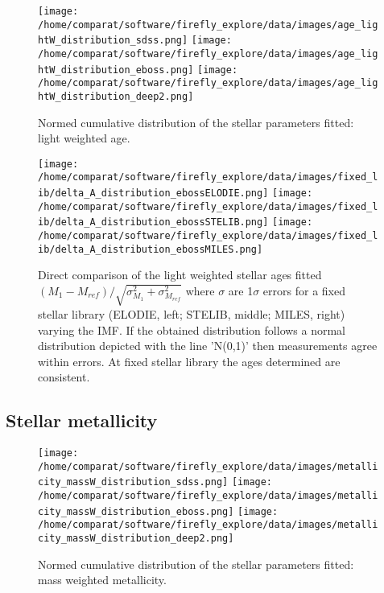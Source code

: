 \documentclass[onecolumn]{aa}
\begin{document}
\begin{figure}
\begin{center}
\caption{\label{fig:distributions:LwA} 
Normed cumulative distribution of the stellar parameters fitted: light weighted age.}  
\texttt{[image: /home/comparat/software/firefly\_explore/data/images/age\_lightW\_distribution\_sdss.png]}
\texttt{[image: /home/comparat/software/firefly\_explore/data/images/age\_lightW\_distribution\_eboss.png]}
\texttt{[image: /home/comparat/software/firefly\_explore/data/images/age\_lightW\_distribution\_deep2.png]}
\end{center}
\end{figure}

\begin{figure}
\begin{center}
\caption{\label{fig:comparison:imfs:A} 
Direct comparison of the light weighted stellar ages fitted $(M_1-M_{ref})/\sqrt{\sigma^2_{M_1}+\sigma^2_{M_{ref}}}$ where $\sigma$ are 1$\sigma$ errors for a fixed stellar library (ELODIE, left; STELIB, middle; MILES, right) varying the IMF. 
If the obtained distribution follows a normal distribution depicted with the line 'N(0,1)' then measurements agree within errors. 
At fixed stellar library the ages determined are consistent.}
\texttt{[image: /home/comparat/software/firefly\_explore/data/images/fixed\_lib/delta\_A\_distribution\_ebossELODIE.png]}
\texttt{[image: /home/comparat/software/firefly\_explore/data/images/fixed\_lib/delta\_A\_distribution\_ebossSTELIB.png]}
\texttt{[image: /home/comparat/software/firefly\_explore/data/images/fixed\_lib/delta\_A\_distribution\_ebossMILES.png]}
\end{center}
\end{figure}

\subsection{Stellar metallicity}

\begin{figure}
\begin{center}
\caption{\label{fig:distributions:MwZ} 
Normed cumulative distribution of the stellar parameters fitted: mass weighted metallicity.}  
\texttt{[image: /home/comparat/software/firefly\_explore/data/images/metallicity\_massW\_distribution\_sdss.png]}
\texttt{[image: /home/comparat/software/firefly\_explore/data/images/metallicity\_massW\_distribution\_eboss.png]}
\texttt{[image: /home/comparat/software/firefly\_explore/data/images/metallicity\_massW\_distribution\_deep2.png]}
\end{center}
\end{figure}
\end{document}

